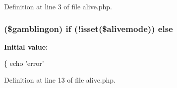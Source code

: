 Definition at line 3 of file alive.\+php.

\hypertarget{alive_8php_ad881d5d00713ee38bbdc36a556e20f9b}{
\subsubsection[{else}]{ (\$gamblingon) {\bf if} (!isset(\$alivemode)) else}}\label{alive_8php_ad881d5d00713ee38bbdc36a556e20f9b}
{\bfseries Initial value\+:}
\begin{DoxyCode}
\{
    echo \textcolor{stringliteral}{'error'}
\end{DoxyCode}


Definition at line 13 of file alive.\+php.

